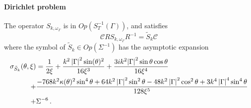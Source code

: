 \documentclass[a4paper]{article}
\begin{document}
\paragraph{Dirichlet problem}

\begin{Lem}
	\label{LemsymbolSk}
	The operator $S_{k,\omega_\Gamma}$ is in $\textit{Op}(S^{-1}_T(\Gamma))$, and satisfies	
	\[\mathcal{C}RS_{k,\omega_\Gamma}R^{-1} = \tilde{S}_k \mathcal{C}\]
	where the symbol of $\tilde{S}_k \in \textit{Op}(\Sigma^{-1})$ has the asymptotic expansion
	\begin{equation}
		\begin{split}
		\sigma_{\tilde{S}_k}(\theta,\xi)&=\displaystyle \frac{1}{2\xi}+\frac{k^2\left\lvert \Gamma \right\rvert^2\sin(\theta)^2}{16\xi^3}+{\frac {3i{k}^{2}{\left\lvert \Gamma \right\rvert}^{2}\sin \theta \cos \theta }{16{\xi}^{4}}}\\
		+ &\frac{-768 k^2 \kappa(\theta)^2 \sin^4\theta + 64k^2\left\lvert \Gamma \right\rvert^2 \sin^2 \theta - 48k^2\left\lvert \Gamma \right\rvert^2 \cos^2\theta + 3k^4 \left\lvert \Gamma \right\rvert^4 \sin^4\theta}{128 \xi^5}\\
		+ & \Sigma^{-6}\,.
		\end{split}
		\label{symboleSk}
	\end{equation}
\end{Lem}
\end{document}
